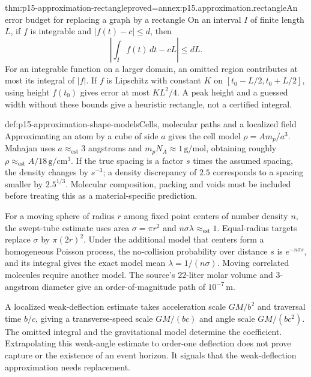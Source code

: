 \begin{hbtheorem}{thm:p15-approximation-rectangle}{proved=annex:p15.approximation.rectangle}{An error budget for replacing a graph by a rectangle}
On an interval \(I\) of finite length \(L\), if \(f\) is integrable and
\(|f(t)-c|\leq d\), then
\[
 \left|\int_I f(t)\,dt-cL\right|\leq dL.
\]
For an integrable function on a larger domain, an omitted region contributes
at most its integral of \(|f|\). If \(f\) is Lipschitz with constant \(K\)
on \([t_0-L/2,t_0+L/2]\), using height \(f(t_0)\) gives error at most
\(KL^2/4\). A peak height and a guessed width without these bounds give
a heuristic rectangle, not a certified integral.
\end{hbtheorem}

\begin{hbexample}{def:p15-approximation-shape-models}{Cells, molecular paths and a localized field}
Approximating an atom by a cube of side \(a\) gives the cell model
\(\rho=A m_p/a^3\). Mahajan uses \(a\approx_{\mathrm{est}}3\) angstroms and
\(m_pN_A\approx1\,\mathrm{g/mol}\), obtaining roughly
\(\rho\approx_{\mathrm{est}}A/18\,\mathrm{g/cm^3}\).
If the true spacing is a factor \(s\) times the assumed spacing, the density
changes by \(s^{-3}\); a density discrepancy of \(2.5\) corresponds to a
spacing smaller by \(2.5^{1/3}\). Molecular composition, packing and voids
must be included before treating this as a material-specific prediction.

For a moving sphere of radius \(r\) among fixed point centers of number
density \(n\), the swept-tube estimate uses area \(\sigma=\pi r^2\) and
\(n\sigma\lambda\approx_{\mathrm{est}}1\). Equal-radius targets replace
\(\sigma\) by \(\pi(2r)^2\). Under the additional model that centers form
a homogeneous Poisson process, the no-collision probability over distance
\(s\) is \(e^{-n\sigma s}\), and its integral gives the exact model mean
\(\lambda=1/(n\sigma)\). Moving correlated molecules require another model.
The source's \(22\)-liter molar volume and \(3\)-angstrom diameter give an
order-of-magnitude path of \(10^{-7}\,\mathrm m\).

A localized weak-deflection estimate takes acceleration scale \(GM/b^2\)
and traversal time \(b/c\), giving a transverse-speed scale \(GM/(bc)\)
and angle scale \(GM/(bc^2)\). The omitted integral and the gravitational
model determine the coefficient. Extrapolating this weak-angle estimate to
order-one deflection does not prove capture or the existence of an event
horizon. It signals that the weak-deflection approximation needs replacement.
\end{hbexample}

